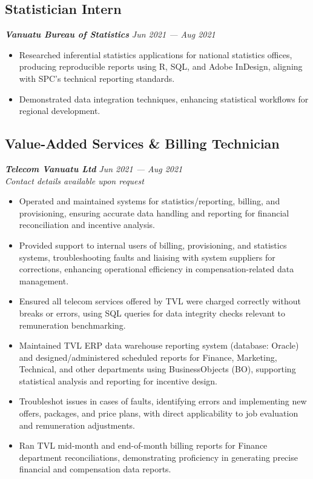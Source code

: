 \documentclass[
  letterpaper,
  DIV=11,
  numbers=noendperiod]{scrartcl}
\providecommand{\tightlist}{%
  \setlength{\itemsep}{0pt}\setlength{\parskip}{0pt}}
\begin{document}
\subsection{Statistician Intern}\label{statistician-intern}

\textbf{\emph{Vanuatu Bureau of Statistics}} {\emph{Jun 2021 --- Aug
2021}}

\begin{itemize}
\tightlist
\item
  Researched inferential statistics applications for national statistics
  offices, producing reproducible reports using R, SQL, and Adobe
  InDesign, aligning with SPC's technical reporting standards.
\item
  Demonstrated data integration techniques, enhancing statistical
  workflows for regional development.
\end{itemize}

\subsection{Value-Added Services \& Billing
Technician}\label{value-added-services-billing-technician}

\textbf{\emph{Telecom Vanuatu Ltd}} {\emph{Jun 2021 --- Aug 2021}}\\
\emph{Contact details available upon request}

\begin{itemize}
\tightlist
\item
  Operated and maintained systems for statistics/reporting, billing, and
  provisioning, ensuring accurate data handling and reporting for
  financial reconciliation and incentive analysis.
\item
  Provided support to internal users of billing, provisioning, and
  statistics systems, troubleshooting faults and liaising with system
  suppliers for corrections, enhancing operational efficiency in
  compensation-related data management.
\item
  Ensured all telecom services offered by TVL were charged correctly
  without breaks or errors, using SQL queries for data integrity checks
  relevant to remuneration benchmarking.
\item
  Maintained TVL ERP data warehouse reporting system (database: Oracle)
  and designed/administered scheduled reports for Finance, Marketing,
  Technical, and other departments using BusinessObjects (BO),
  supporting statistical analysis and reporting for incentive design.
\item
  Troubleshot issues in cases of faults, identifying errors and
  implementing new offers, packages, and price plans, with direct
  applicability to job evaluation and remuneration adjustments.
\item
  Ran TVL mid-month and end-of-month billing reports for Finance
  department reconciliations, demonstrating proficiency in generating
  precise financial and compensation data reports.
\end{itemize}
\end{document}
